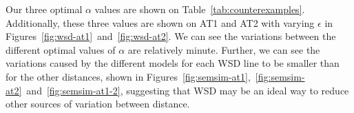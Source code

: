 Our three optimal $\alpha$ values are shown on Table~\ref{tab:counterexamples}. Additionally, these three values are shown on AT1 and AT2 with varying $\epsilon$ in Figures~\ref{fig:wsd-at1}~and~\ref{fig:wsd-at2}. We can see the variations between the different optimal values of $\alpha$ are relatively minute. Further, we can see the variations caused by the different models for each WSD line to be smaller than for the other distances, shown in Figures~\ref{fig:semsim-at1},~\ref{fig:semsim-at2}~and~\ref{fig:semsim-at1-2}, suggesting that WSD may be an ideal way to reduce other sources of variation between distance.





















